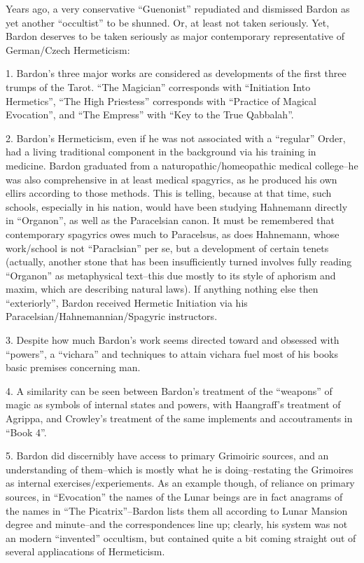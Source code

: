 \begin{footnotesize}
\begin{sffamily}
Years ago, a very conservative ``Guenonist'' repudiated and dismissed Bardon as yet another ``occultist'' to be shunned. Or, at least not taken seriously. Yet, Bardon deserves to be taken seriously as major contemporary representative of German/Czech Hermeticism:

1. Bardon's three major works are considered as developments of the first three trumps of the Tarot. ``The Magician'' corresponds with ``Initiation Into Hermetics'', ``The High Priestess'' corresponds with ``Practice of Magical Evocation'', and ``The Empress'' with ``Key to the True Qabbalah''.

2. Bardon's Hermeticism, even if he was not associated with a ``regular'' Order, had a living traditional component in the background via his training in medicine. Bardon graduated from a naturopathic/homeopathic medical college--he was also comprehensive in at least medical spagyrics, as he produced his own ellirs according to those methods. This is telling, because at that time, such schools, especially in his nation, would have been studying Hahnemann directly in ``Organon'', as well as the Paracelsian canon. It must be remembered that contemporary spagyrics owes much to Paracelsus, as does Hahnemann, whose work/school is not ``Paraclsian'' per se, but a development of certain tenets (actually, another stone that has been insufficiently turned involves fully reading ``Organon'' as metaphysical text--this due mostly to its style of aphorism and maxim, which are describing natural laws). If anything nothing else then ``exteriorly'', Bardon received Hermetic Initiation via his Paracelsian/Hahnemannian/Spagyric instructors.

3. Despite how much Bardon's work seems directed toward and obsessed with ``powers'', a ``vichara'' and techniques to attain vichara fuel most of his books basic premises concerning man.

4. A similarity can be seen between Bardon's treatment of the ``weapons'' of magic as symbols of internal states and powers, with Haangraff's treatment of Agrippa, and Crowley's treatment of the same implements and accoutraments in ``Book 4''.

5. Bardon did discernibly have access to primary Grimoiric sources, and an understanding of them--which is mostly what he is doing--restating the Grimoires as internal exercises/experiements. As an example though, of reliance on primary sources, in ``Evocation'' the names of the Lunar beings are in fact anagrams of the names in ``The Picatrix''--Bardon lists them all according to Lunar Mansion degree and minute--and the correspondences line up; clearly, his system was not an modern ``invented'' occultism, but contained quite a bit coming straight out of several appliacations of Hermeticism.


\end{sffamily}
\end{footnotesize}

